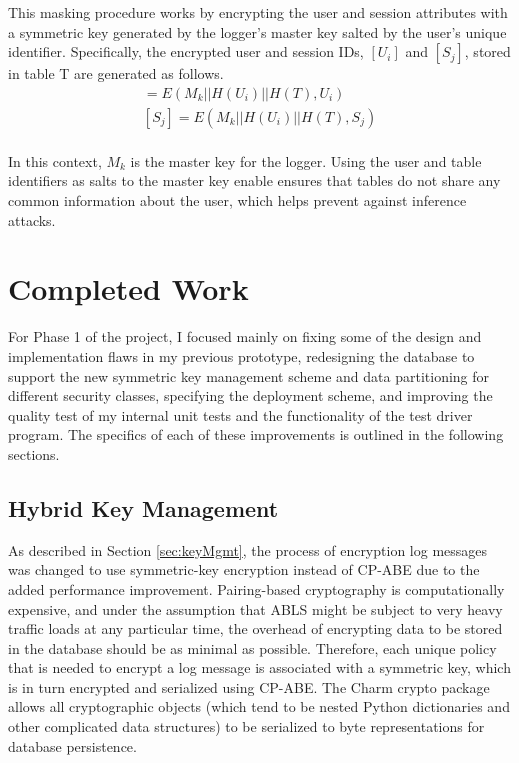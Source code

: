 \documentclass{sig-alternate}
\begin{document}
This masking procedure works by encrypting the user and session attributes with a symmetric key generated
by the logger's master key salted by the user's unique identifier. Specifically, the encrypted user and session IDs, $[U_i]$ 
and $[S_j]$, stored in table T are generated as follows.
\begin{align*}
[U_i] = E(M_k || H(U_i) || H(T), U_i) \\
[S_j] = E(M_k || H(U_i) || H(T), S_j) \\
\end{align*}

In this context, $M_k$ is the master key for the logger. Using the user and table identifiers as salts to the master key 
enable ensures that tables do not share any common information about the user, which helps prevent against 
inference attacks.

\section{Completed Work}
For Phase 1 of the project, I focused mainly on fixing some of the design and implementation flaws in my previous 
prototype, redesigning the database to support the new symmetric key management scheme and data 
partitioning for different security classes, specifying the deployment scheme, and improving the quality test
of my internal unit tests and the functionality of the test driver program. The specifics of each of these improvements is
outlined in the following sections.

\subsection{Hybrid Key Management}
As described in Section \ref{sec:keyMgmt}, the process of encryption log messages was changed to use symmetric-key
encryption instead of CP-ABE due to the added performance improvement. Pairing-based cryptography is computationally
expensive, and under the assumption that ABLS might be subject to very heavy traffic loads at any particular time, the 
overhead of encrypting data to be stored in the database should be as minimal as possible. Therefore, each unique
policy that is needed to encrypt a log message is associated with a symmetric key, which is in turn encrypted and 
serialized using CP-ABE. The Charm crypto package allows all cryptographic objects (which tend to be nested
Python dictionaries and other complicated data structures) to be serialized to byte representations for database 
persistence. 
\end{document}
